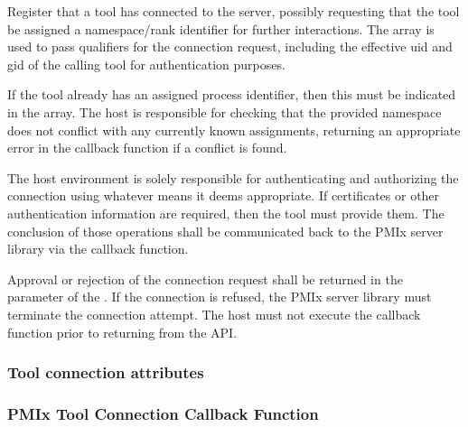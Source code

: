 \optattrend

\descr

Register that a tool has connected to the server, possibly requesting that the
tool be assigned a namespace/rank identifier for further interactions.
The  array is used to pass qualifiers for the
connection request, including the effective uid and gid of the calling tool
for authentication purposes.

If the tool already has an assigned process identifier, then this must be
indicated in the  array. The host is responsible for checking
that the provided namespace does not conflict with any currently known
assignments, returning an appropriate error in the callback function if a conflict is found.

The host environment is solely responsible for authenticating and authorizing
the connection using whatever means it deems appropriate. If certificates or
other authentication information are required, then the tool must provide them.
The conclusion of those operations shall be communicated back to the \ac{PMIx}
server library via the callback function.

Approval or rejection of the connection request shall be returned in the
 parameter of the . If
the connection is refused, the \ac{PMIx} server library must terminate the
connection attempt. The host must not execute the callback function prior to
returning from the \ac{API}.

\subsubsection{Tool connection attributes}

%

%

%



\subsubsection{PMIx Tool Connection Callback Function}

